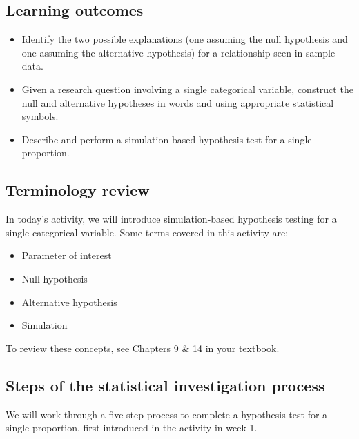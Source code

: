 \documentclass[
]{report}
\begin{document}

\hypertarget{learning-outcomes}{%
\subsection{Learning outcomes}\label{learning-outcomes}}

\begin{itemize}
\item
  Identify the two possible explanations (one assuming the null hypothesis and one assuming the alternative hypothesis) for a relationship seen in sample data.
\item
  Given a research question involving a single categorical variable, construct the null and alternative hypotheses
  in words and using appropriate statistical symbols.
\item
  Describe and perform a simulation-based hypothesis test for a single proportion.
\end{itemize}

\hypertarget{terminology-review}{%
\subsection{Terminology review}\label{terminology-review}}

In today's activity, we will introduce simulation-based hypothesis testing for a single categorical variable. Some terms covered in this activity are:

\begin{itemize}
\item
  Parameter of interest
\item
  Null hypothesis
\item
  Alternative hypothesis
\item
  Simulation
\end{itemize}

To review these concepts, see Chapters 9 \& 14 in your textbook.

\hypertarget{steps-of-the-statistical-investigation-process}{%
\subsection{Steps of the statistical investigation process}\label{steps-of-the-statistical-investigation-process}}

We will work through a five-step process to complete a hypothesis test for a single proportion, first introduced in the activity in week 1.
\end{document}

